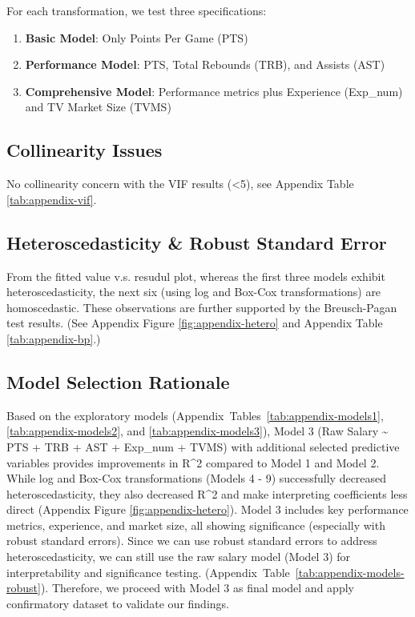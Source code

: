 \documentclass[
  11pt,
]{article}
\begin{document}
For each transformation, we test three specifications:

\begin{enumerate}
\def\labelenumi{\arabic{enumi}.}
\item
  \textbf{Basic Model}: Only Points Per Game (PTS)
\item
  \textbf{Performance Model}: PTS, Total Rebounds (TRB), and Assists (AST)
\item
  \textbf{Comprehensive Model}: Performance metrics plus Experience (Exp\_num) and TV Market Size (TVMS)
\end{enumerate}

\hypertarget{collinearity-issues}{%
\subsection{Collinearity Issues}\label{collinearity-issues}}

No collinearity concern with the VIF results (\textless5), see Appendix Table \ref{tab:appendix-vif}.

\hypertarget{heteroscedasticity-robust-standard-error}{%
\subsection{Heteroscedasticity \& Robust Standard Error}\label{heteroscedasticity-robust-standard-error}}

From the fitted value v.s. resudul plot, whereas the first three models exhibit heteroscedasticity, the next six (using log and Box-Cox transformations) are homoscedastic.
These observations are further supported by the Breusch-Pagan test results.
(See Appendix Figure \ref{fig:appendix-hetero} and Appendix Table \ref{tab:appendix-bp}.)

\hypertarget{model-selection-rationale}{%
\subsection{Model Selection Rationale}\label{model-selection-rationale}}

Based on the exploratory models (Appendix~Tables~\ref{tab:appendix-models1}, \ref{tab:appendix-models2}, and \ref{tab:appendix-models3}),
Model 3 (Raw Salary \textasciitilde{} PTS + TRB + AST + Exp\_num + TVMS) with additional selected predictive variables provides improvements in R\^{}2 compared to Model 1 and Model 2.
While log and Box-Cox transformations (Models 4 - 9) successfully decreased heteroscedasticity, they also decreased R\^{}2 and make interpreting coefficients less direct (Appendix Figure \ref{fig:appendix-hetero}).
Model 3 includes key performance metrics, experience, and market size, all showing significance (especially with robust standard errors). Since we can use robust standard errors to address heteroscedasticity, we can still use the raw salary model (Model 3) for interpretability and significance testing.
(Appendix~Table~\ref{tab:appendix-models-robust}). Therefore, we proceed with Model 3 as final model and apply confirmatory dataset to validate our findings.
\end{document}
